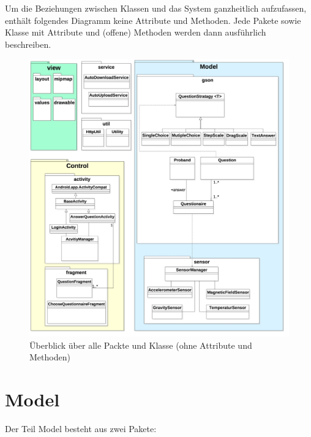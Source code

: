 \documentclass[a4paper]{scrreprt}
\begin{document}
            \noindent Um die Beziehungen zwischen Klassen und das System ganzheitlich aufzufassen, enthält folgendes Diagramm keine Attribute und Methoden. Jede Pakete sowie Klasse mit Attribute und (offene) Methoden werden dann ausführlich beschreiben.



            \newpage
            \vspace*{1cm}
            \begin{figure}[H]
                \centering
                \includegraphics[scale = 0.25]{packageDiagram.jpg}
                \caption{Überblick über alle Packte und Klasse (ohne Attribute und Methoden)}
            \end{figure}





        \section{Model}

            Der Teil Model besteht aus zwei Pakete:
\end{document}
